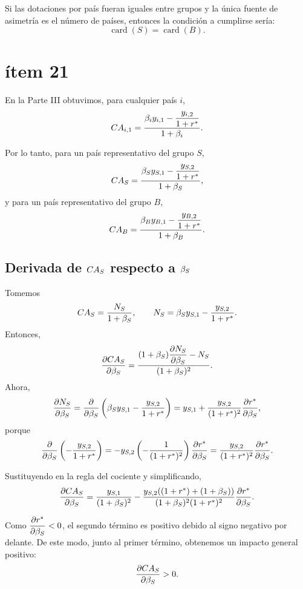 Si las dotaciones por país fueran iguales entre grupos y la única fuente de asimetría es el número de países, entonces la condición a cumplirse sería:
\[
\operatorname{card}(S)=\operatorname{card}(B).
\]

\section*{ítem 21}
En la Parte III obtuvimos, para cualquier país $i$,
\[
CA_{i,1}
=
\frac{\beta_i y_{i,1} - \dfrac{y_{i,2}}{1+r^*}}{1+\beta_i}.
\]

Por lo tanto, para un país representativo del grupo $S$,
\begin{equation}
CA_S
=
\frac{\beta_S y_{S,1} - \dfrac{y_{S,2}}{1+r^*}}{1+\beta_S},
\label{eq:cas}
\end{equation}
y para un país representativo del grupo $B$,
\begin{equation}
CA_B
=
\frac{\beta_B y_{B,1} - \dfrac{y_{B,2}}{1+r^*}}{1+\beta_B}.
\label{eq:cab}
\end{equation}

\subsection*{Derivada de $CA_S$ respecto a $\beta_S$}
Tomemos
\[
CA_S = \frac{N_S}{1+\beta_S},
\qquad
N_S = \beta_S y_{S,1} - \frac{y_{S,2}}{1+r^*}.
\]
Entonces,
\[
\frac{\partial CA_S}{\partial \beta_S}
=
\frac{(1+\beta_S)\dfrac{\partial N_S}{\partial \beta_S} - N_S}{(1+\beta_S)^2}.
\]
Ahora,
\[
\frac{\partial N_S}{\partial \beta_S}
=
\frac{\partial}{\partial \beta_S}
\left(
\beta_S y_{S,1} - \frac{y_{S,2}}{1+r^*}
\right)
=
 y_{S,1} + \frac{y_{S,2}}{(1+r^*)^2}\frac{\partial r^*}{\partial \beta_S},
\]
porque
\[
\frac{\partial}{\partial \beta_S}\left(-\frac{y_{S,2}}{1+r^*}\right)
=
-y_{S,2}\left(-\frac{1}{(1+r^*)^2}\right)\frac{\partial r^*}{\partial \beta_S}
=
\frac{y_{S,2}}{(1+r^*)^2}\frac{\partial r^*}{\partial \beta_S}.
\]

Sustituyendo en la regla del cociente y simplificando,
\begin{equation}
\frac{\partial CA_S}{\partial \beta_S}
=
\frac{y_{S,1}}{(1+\beta_S)^2}
-
\frac{y_{S,2}((1+r^*)+(1+\beta_S))}{(1+\beta_S)^2(1+r^*)^2}\frac{\partial r^*}{\partial \beta_S}.
\label{eq:dcasdbetas}
\end{equation}

Como $\dfrac{\partial r^*}{\partial \beta_S}<0$, el segundo término es positivo debido al signo negativo por delante. De este modo, junto al primer término, obtenemos un impacto general positivo:
\[
\frac{\partial CA_S}{\partial \beta_S} > 0.
\]

